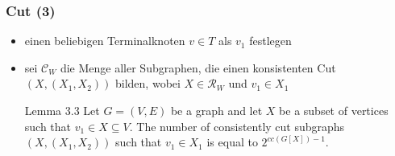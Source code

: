 \documentclass{beamer}
\begin{document}
\begin{frame}
\frametitle{Cut (3)}
\begin{itemize}
\item einen beliebigen Terminalknoten $v \in T$ als $v_1$ festlegen
\item sei $\mathcal{C}_W$ die Menge aller Subgraphen, die einen konsistenten Cut $(X,(X_1,X_2))$ bilden, wobei $X\in \mathcal{R}_W$ und $v_1 \in X_1$ 
\newline
\newline
\begin{block}{Lemma 3.3}
Let $G=(V,E)$ be a graph and let $X$ be a subset of vertices such that $v_1 \in X \subseteq V$. The number of
consistently cut subgraphs $(X,(X_1,X_2))$ such that $v_1 \in X_1$ is equal to $2^{cc(G[X])-1}$.
\end{block}

\end{itemize}
\end{frame}
\end{document}
